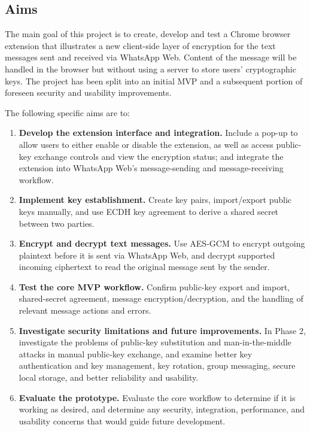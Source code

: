\documentclass[11pt]{article}
\begin{document}
\subsection{Aims}

The main goal of this project is to create, develop and test a Chrome browser extension that illustrates a new client-side layer of encryption for the text messages sent and received via WhatsApp Web. Content of the message will be handled in the browser but without using a server to store users' cryptographic keys. The project has been split into an initial MVP and a subsequent portion of foreseen security and usability improvements.

The following specific aims are to:

\begin{enumerate}
    \item \textbf{Develop the extension interface and integration.} Include a pop-up to allow users to either enable or disable the extension, as well as access public-key exchange controls and view the encryption status; and integrate the extension into WhatsApp Web's message-sending and message-receiving workflow.

    \item \textbf{Implement key establishment.} Create key pairs, import/export public keys manually, and use ECDH key agreement to derive a shared secret between two parties.

    \item \textbf{Encrypt and decrypt text messages.} Use AES-GCM to encrypt outgoing plaintext before it is sent via WhatsApp Web, and decrypt supported incoming ciphertext to read the original message sent by the sender.

    \item \textbf{Test the core MVP workflow.} Confirm public-key export and import, shared-secret agreement, message encryption/decryption, and the handling of relevant message actions and errors.

    \item \textbf{Investigate security limitations and future improvements.} In Phase 2, investigate the problems of public-key substitution and man-in-the-middle attacks in manual public-key exchange, and examine better key authentication and key management, key rotation, group messaging, secure local storage, and better reliability and usability.

    \item \textbf{Evaluate the prototype.} Evaluate the core workflow to determine if it is working as desired, and determine any security, integration, performance, and usability concerns that would guide future development.
\end{enumerate}
\end{document}
